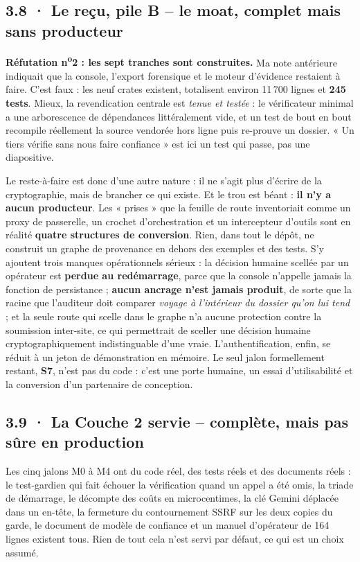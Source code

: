 \documentclass[10pt]{article}
\begin{document}
\subsection{3.8 · Le reçu, pile B -- le moat, complet mais sans producteur}

\textbf{Réfutation n\textsuperscript{o}2 : les sept tranches sont construites.} Ma note antérieure
indiquait que la console, l'export forensique et le moteur d'évidence restaient à faire. C'est faux :
les neuf crates existent, totalisent environ 11\,700 lignes et \textbf{245 tests}. Mieux, la
revendication centrale est \emph{tenue et testée} : le vérificateur minimal a une arborescence de
dépendances littéralement vide, et un test de bout en bout recompile réellement la source vendorée hors
ligne puis re-prouve un dossier. « Un tiers vérifie sans nous faire confiance » est ici un test qui
passe, pas une diapositive.

Le reste-à-faire est donc d'une autre nature : il ne s'agit plus d'écrire de la cryptographie, mais de
brancher ce qui existe. Et le trou est béant : \textbf{il n'y a aucun producteur}. Les « prises » que la
feuille de route inventoriait comme un proxy de passerelle, un crochet d'orchestration et un
intercepteur d'outils sont en réalité \textbf{quatre structures de conversion}. Rien, dans tout le
dépôt, ne construit un graphe de provenance en dehors des exemples et des tests. S'y ajoutent trois
manques opérationnels sérieux : la décision humaine scellée par un opérateur est \textbf{perdue au
redémarrage}, parce que la console n'appelle jamais la fonction de persistance ; \textbf{aucun ancrage
n'est jamais produit}, de sorte que la racine que l'auditeur doit comparer \emph{voyage à l'intérieur du
dossier qu'on lui tend} ; et la seule route qui scelle dans le graphe n'a aucune protection contre la
soumission inter-site, ce qui permettrait de sceller une décision humaine cryptographiquement
indistinguable d'une vraie. L'authentification, enfin, se réduit à un jeton de démonstration en
mémoire. Le seul jalon formellement restant, \textbf{S7}, n'est pas du code : c'est une porte humaine,
un essai d'utilisabilité et la conversion d'un partenaire de conception.

\subsection{3.9 · La Couche 2 servie -- complète, mais pas sûre en production}

Les cinq jalons M0 à M4 ont du code réel, des tests réels et des documents réels : le test-gardien qui
fait échouer la vérification quand un appel a été omis, la triade de démarrage, le décompte des coûts en
microcentimes, la clé Gemini déplacée dans un en-tête, la fermeture du contournement SSRF sur les deux
copies du garde, le document de modèle de confiance et un manuel d'opérateur de 164 lignes existent
tous. Rien de tout cela n'est servi par défaut, ce qui est un choix assumé.
\end{document}
